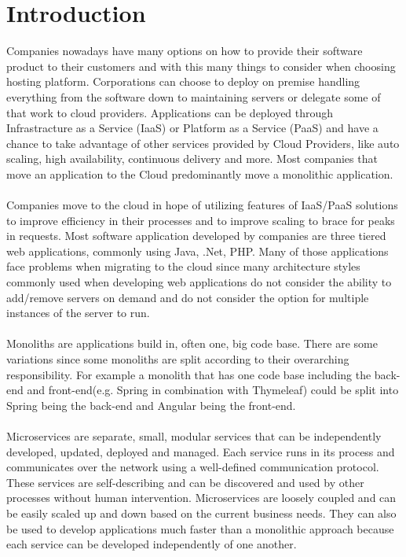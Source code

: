 \documentclass[MMR,Master,nenglish]{twbook}%
\begin{document}
\maketitle

%
%
\chapter{Introduction}
Companies nowadays have many options on how to provide their software product to their customers and with this many things to consider when choosing hosting platform. Corporations can choose to deploy on premise handling everything from the software down to maintaining servers or delegate some of that work to cloud providers. Applications can be deployed through Infrastracture as a Service (IaaS)\cite{microIaas} or Platform as a Service (PaaS)\cite{redPaas} and have a chance to take advantage of other services provided by Cloud Providers, like auto scaling, high availability, continuous delivery and more. Most companies that move an application to the Cloud predominantly move a monolithic application. 
\\
\\
Companies move to the cloud in hope of utilizing features of IaaS/PaaS solutions to improve efficiency in their processes and to improve scaling to brace for peaks in requests. Most software application developed by companies are three tiered web applications, commonly using Java, .Net, PHP. Many of those applications face problems when migrating to the cloud since many architecture styles commonly used when developing web applications do not consider the ability to add/remove servers on demand and do not consider the option for multiple instances of the server to run.
\\
\\
Monoliths are applications build in, often one, big code base. There are some variations since some monoliths are split according to their overarching responsibility. For example a monolith that has one code base including the back-end and front-end(e.g. Spring in combination with Thymeleaf) could be split into Spring being the back-end and Angular being the front-end.
\\
\\
Microservices are separate, small, modular services that can be independently developed, updated, deployed and managed. Each service runs in its process and communicates over the network using a well-defined communication protocol. These services are self-describing and can be discovered and used by other processes without human intervention. Microservices are loosely coupled and can be easily scaled up and down based on the current business needs. They can also be used to develop applications much faster than a monolithic approach because each service can be developed independently of one another.\cite{ade2017}
\end{document}
